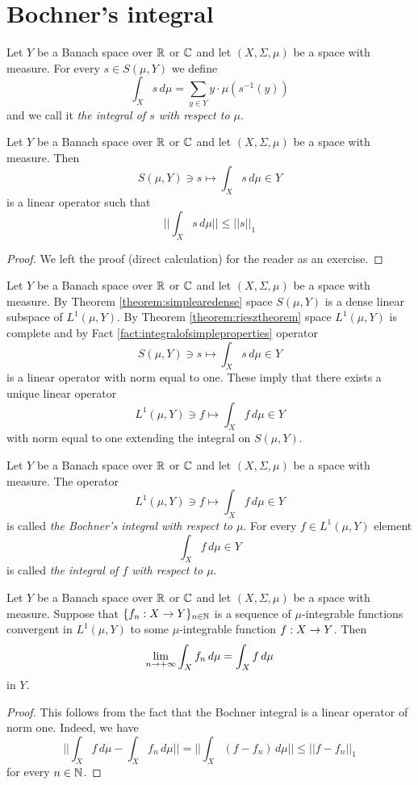 \section{Bochner's integral}\label{section:bochnerintegration}

\begin{definition}
Let $Y$ be a Banach space over ${\mathbb R}$ or ${\mathbb C}$ and let $(X,\Sigma,\mu)$ be a space with measure. For every $s \in S(\mu, Y)$ we define
$$\int_X s\,d\mu = \sum_{y\in Y}y\cdot \mu\left(s^{-1}(y)\right)$$
and we call it \textit{the integral of $s$ with respect to $\mu$}.
\end{definition}

\begin{fact}\label{fact:integralofsimpleproperties}
Let $Y$ be a Banach space over ${\mathbb R}$ or ${\mathbb C}$ and let $(X,\Sigma,\mu)$ be a space with measure. Then
$$S(\mu, Y)\ni s \mapsto \int_Xs\,d\mu \in Y$$
is a linear operator such that
$$\bigg|\bigg|\int_Xs\,d\mu\bigg|\bigg|\leq ||s||_1$$
\end{fact}
\begin{proof}
We left the proof (direct calculation) for the reader as an exercise.
\end{proof}
\noindent
Let $Y$ be a Banach space over ${\mathbb R}$ or ${\mathbb C}$ and let $(X,\Sigma,\mu)$ be a space with measure. By Theorem \ref{theorem:simplearedense} space $S(\mu, Y)$ is a dense linear subspace of $L^1(\mu, Y)$. By Theorem \ref{theorem:riesztheorem} space $L^1(\mu, Y)$ is complete and by Fact \ref{fact:integralofsimpleproperties} operator
$$S(\mu, Y)\ni s \mapsto \int_Xs\,d\mu \in Y$$
is a linear operator with norm equal to one. These imply that there exists a unique linear operator
$$L^1(\mu, Y)\ni f\mapsto \int_Xf\,d\mu\in Y$$
with norm equal to one extending the integral on $S(\mu, Y)$.

\begin{definition}
Let $Y$ be a Banach space over ${\mathbb R}$ or ${\mathbb C}$ and let $(X,\Sigma,\mu)$ be a space with measure. The operator
$$L^1(\mu, Y)\ni f\mapsto \int_Xf\,d\mu\in Y$$
is called \textit{the Bochner's integral with respect to $\mu$}. For every $f\in L^1(\mu, Y)$ element
$$\int_Xf\,d\mu\in Y$$
is called \textit{the integral of $f$ with respect to $\mu$}.
\end{definition}

\begin{corollary}\label{corollary:convergenceofintegral}
Let $Y$ be a Banach space over ${\mathbb R}$ or ${\mathbb C}$ and let $(X,\Sigma,\mu)$ be a space with measure. Suppose that $\{f_n:X\rightarrow Y\}_{n\in {\mathbb N}}$ is a sequence of $\mu$-integrable functions convergent in $L^1(\mu, Y)$ to some $\mu$-integrable function $f:X\rightarrow Y$. Then
$$\lim_{n\rightarrow +\infty}\int_Xf_n\,d\mu = \int_Xf\,d\mu$$
in $Y$.
\end{corollary}
\begin{proof}
This follows from the fact that the Bochner integral is a linear operator of norm one. Indeed, we have
$$\bigg|\bigg|\int_Xf\,d\mu - \int_Xf_n\,d\mu\bigg|\bigg| = \bigg|\bigg|\int_X\left(f-f_n\right)\,d\mu\bigg|\bigg|\leq ||f - f_n||_1 $$
for every $n\in {\mathbb N}$.
\end{proof}

